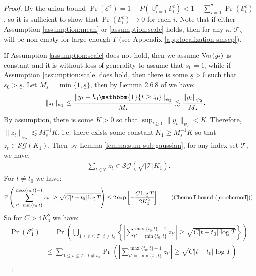 \begin{proof}
By the union bound $\Pr(\mathcal{E}^c) = 1 - P(\cup_{i=1}^7 \mathcal{E}^c_i) < 1 - \sum_{i=1}^7 \Pr(\mathcal{E}^c_i)$, so it is sufficient to show that $\Pr(\mathcal{E}^c_i) \to 0$ for each $i$. Note that if either Assumption \ref{assumption:mean} or \ref{assumption:scale} holds, then for any  $\kappa$, $\mathcal{T}_{\kappa}$ will be non-empty for large enough $T$ (see Appendix \ref{app:localization-smscp}). 

If Assumption \ref{assumption:scale} does not hold, then we assume $\text{\normalfont Var}(y_t)$ is constant and it is without loss of generality to assume that $s_0=1$, while if  Assumption \ref{assumption:scale} does hold, then there is some $\underline{s} > 0$ such that $s_0 > \underline{s}$. Let $M_s = \min\{1, \underline{s}\}$, then by Lemma 2.6.8 of \cite{Vershynin18} we have: 
\begin{align*}
    \lVert z_t \rVert_{\psi_2} &\leq 
    \frac{\left\lVert y_t - b_0\mathbbm{1}\{t\geq t_0\}\right\rVert_{\psi_2}}{M_s} \lesssim \frac{\left\lVert y_t\right\rVert_{\psi_2}}{M_s}.
\end{align*}
By assumption, there is some $K > 0$ so that $\sup_{t \geq 1} \lVert y_t\rVert_{\psi_2} < K$. Therefore, $\lVert z_t \rVert_{\psi_2} \lesssim M_s^{-1}K$, i.e. there exists some constant $K_1 \geq  M_s^{-1}K$ so that $z_t \in \mathcal{SG}(K_1)$. Then by Lemma \ref{lemma:sum-sub-gaussian}, for any index set $\mathcal{T}$, we have:
\begin{align*}
    \sum_{t\in\mathcal{T}} z_t \in\mathcal{SG}\left(\sqrt{|\mathcal{T}|}K_1\right).
\end{align*}
For $t \neq t_0$ we have:
\begin{align*}
     \Pr\left(\left|\sum_{t'=\min\{t_0,t\}}^{\max\{t_0,t\}-1} z_{t'}\right| \geq \sqrt{C|t-t_0|\log T}\right) &\leq 2\exp\left[-\frac{C \log T}{2K^2_1}\right]. \tag{Chernoff bound (\ref{eq:chernoff})} \\
\end{align*}
So for $C > 4K_1^2$ we have:
\small
\begin{align*}
    \Pr(\mathcal{E}^c_1) &= \Pr\left(\bigcup_{1 \leq t \leq T \::\: t \neq t_0 } \left\{\left|\sum_{t'=\min\{t_0,t\}}^{\max\{t_0,t\}-1} z_{t'}\right| \geq \sqrt{C|t-t_0|\log T}\right\} \right) \\
    &\leq \sum_{1 \leq t \leq T \::\: t \neq t_0 } \Pr\left(\left|\sum_{t'=\min\{t_0,t\}}^{\max\{t_0,t\}-1} z_{t'}\right| \geq \sqrt{C|t-t_0|\log T}\right) \tag{union bound} \\

\end{align*}
\end{proof}
